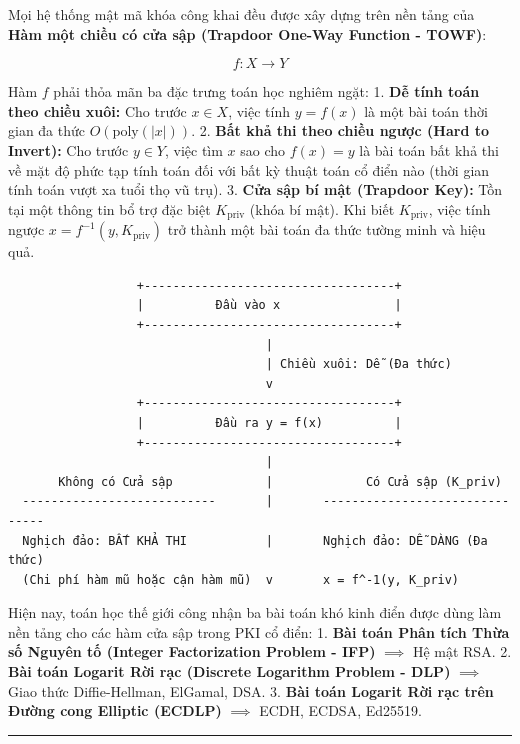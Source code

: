 \documentclass[
]{article}
\begin{document}
Mọi hệ thống mật mã khóa công khai đều được xây dựng trên nền tảng của
\textbf{Hàm một chiều có cửa sập (Trapdoor One-Way Function - TOWF)}:

\[f: X \to Y\]

Hàm \(f\) phải thỏa mãn ba đặc trưng toán học nghiêm ngặt: 1. \textbf{Dễ
tính toán theo chiều xuôi:} Cho trước \(x \in X\), việc tính
\(y = f(x)\) là một bài toán thời gian đa thức \(O(\text{poly}(|x|))\).
2. \textbf{Bất khả thi theo chiều ngược (Hard to Invert):} Cho trước
\(y \in Y\), việc tìm \(x\) sao cho \(f(x) = y\) là bài toán bất khả thi
về mặt độ phức tạp tính toán đối với bất kỳ thuật toán cổ điển nào (thời
gian tính toán vượt xa tuổi thọ vũ trụ). 3. \textbf{Cửa sập bí mật
(Trapdoor Key):} Tồn tại một thông tin bổ trợ đặc biệt
\(K_{\text{priv}}\) (khóa bí mật). Khi biết \(K_{\text{priv}}\), việc
tính ngược \(x = f^{-1}(y, K_{\text{priv}})\) trở thành một bài toán đa
thức tường minh và hiệu quả.

\begin{verbatim}
                  +-----------------------------------+
                  |          Đầu vào x                |
                  +-----------------------------------+
                                    |
                                    | Chiều xuôi: Dễ (Đa thức)
                                    v
                  +-----------------------------------+
                  |          Đầu ra y = f(x)          |
                  +-----------------------------------+
                                    |
       Không có Cửa sập             |             Có Cửa sập (K_priv)
  ---------------------------       |       -------------------------------
  Nghịch đảo: BẤT KHẢ THI           |       Nghịch đảo: DỄ DÀNG (Đa thức)
  (Chi phí hàm mũ hoặc cận hàm mũ)  v       x = f^-1(y, K_priv)
\end{verbatim}

Hiện nay, toán học thế giới công nhận ba bài toán khó kinh điển được
dùng làm nền tảng cho các hàm cửa sập trong PKI cổ điển: 1. \textbf{Bài
toán Phân tích Thừa số Nguyên tố (Integer Factorization Problem - IFP)}
\(\implies\) Hệ mật RSA. 2. \textbf{Bài toán Logarit Rời rạc (Discrete
Logarithm Problem - DLP)} \(\implies\) Giao thức Diffie-Hellman,
ElGamal, DSA. 3. \textbf{Bài toán Logarit Rời rạc trên Đường cong
Elliptic (ECDLP)} \(\implies\) ECDH, ECDSA, Ed25519.

\begin{center}\rule{0.5\linewidth}{0.5pt}\end{center}
\end{document}
